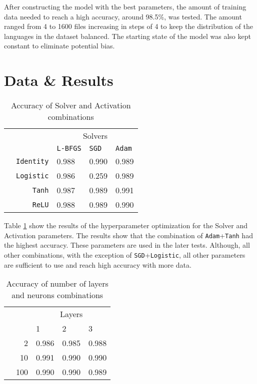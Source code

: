 \documentclass[acmlarge]{acmart}
\begin{document}
After constructing the model with the best parameters, the amount of training data
needed to reach a high accuracy, around 98.5\%, was tested. The amount ranged from
4 to 1600 files increasing in steps of 4 to keep the distribution of the languages
in the dataset balanced. The starting state of the model was also kept constant to
eliminate potential bias.

\section{Data \& Results}
\begin{table}[htbp]
	\caption{Accuracy of Solver and Activation combinations}
	\label{tab:solver_activation}
	\begin{tabular}{rr|lll}
		&& \multicolumn{3}{c}{Solvers}\\
		&&\verb|L-BFGS|&\verb|SGD|&\verb|Adam|\\
		\cmidrule{2-5}
		&\verb|Identity|&0.988&0.990&0.989\\
		&\verb|Logistic|&0.986&0.259&0.989\\
		&\verb|Tanh|    &0.987&0.989&0.991\\
		\smash{\rotatebox[origin=l]{90}{\small Activations}}&\verb|ReLU|&0.988&0.989&0.990\\
		\cmidrule[0.75pt]{2-5}
	\end{tabular}
\end{table}

Table \ref{tab:solver_activation} show the results of the hyperparameter optimization
for the Solver and Activation parameters. The results show that the combination of
\verb|Adam|+\verb|Tanh| had the highest accuracy. These parameters are used in the
later tests. Although, all other combinations, with the exception of
\verb|SGD|+\verb|Logistic|, all other parameters are sufficient to use and reach high
accuracy with more data.

\begin{table}[htbp]
	\caption{Accuracy of number of layers and neurons combinations}
	\label{tab:neurons}
	\begin{tabular}{rr|lll}
		&& \multicolumn{3}{c}{Layers}\\
		&&1&2&3\\
		\cmidrule{2-5}
		&2&0.986&0.985&0.988\\
		\smash{\rotatebox[origin=c]{90}{\small Neurons}}&10&0.991&0.990&0.990\\
		&100&0.990&0.990&0.989\\
		\cmidrule[0.75pt]{2-5}
	\end{tabular}
\end{table}
\end{document}
